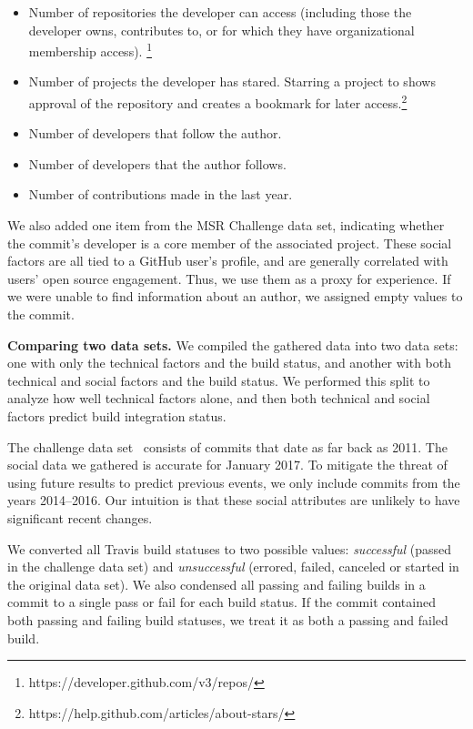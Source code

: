 \documentclass[10pt, conference]{IEEEtran}
\begin{document}
\begin{itemize}
	\item Number of repositories the developer can access (including those
the developer owns, contributes to, or for which they have
organizational membership access).%
\footnote{https://developer.github.com/v3/repos/}
\item  Number of projects the developer has stared. Starring a project
to shows approval of the repository and creates a bookmark for later 
access.\footnote{https://help.github.com/articles/about-stars/}
\item Number of developers that follow the author. 
\item Number of developers that the author follows.
\item Number of contributions made in the last year.
\end{itemize}

We also added one item from the MSR Challenge data set, indicating
whether the commit's developer is a core member  
of the associated project.
These social factors are all tied to a GitHub user's profile,
and are generally correlated with users' open source engagement.
Thus, we use them as a proxy for
experience.  If we were unable to find information about an author, we
assigned empty values to the commit.

\vspace{1ex}
\noindent\textbf{Comparing two data sets.} We compiled the gathered data into 
two data sets: one with only the technical
factors and the build status, and another with both technical and social
factors and the build status. We performed this split to analyze how well 
technical factors alone,
and then both technical and social
factors predict build integration status.

The challenge data set~\cite{msr17challenge} consists
of commits that date as far back as 2011. The social data we 
gathered is accurate for January 2017. To mitigate the threat of
using future results to predict previous events,
we only include commits from the years 2014--2016.  Our intuition is
that these social attributes are unlikely to have significant recent changes.

We converted all Travis build statuses to two possible values:
\emph{successful} (passed in the challenge data set) and \emph{unsuccessful}
(errored, failed, canceled
or started in the original data set). We also condensed all passing and
failing builds in a commit to a single pass or fail for each build status.  If
the commit contained both passing and failing build statuses, we treat it as
both a passing and failed build. 
\end{document}
